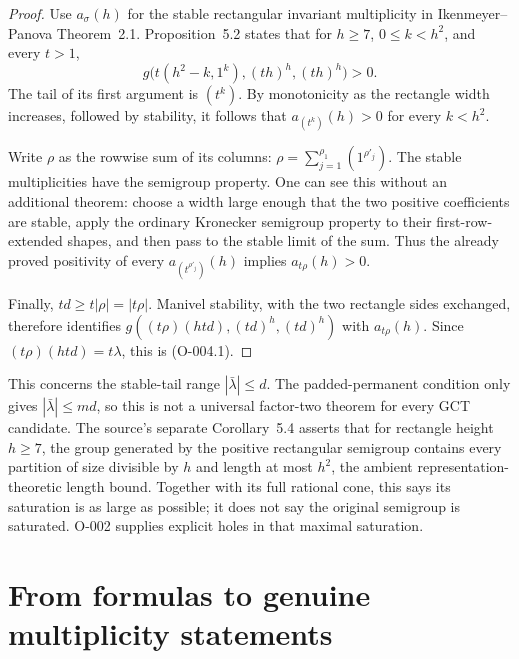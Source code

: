 \begin{proof}
Use $a_\sigma(h)$ for the stable rectangular invariant multiplicity
in Ikenmeyer--Panova Theorem~2.1.  Proposition~5.2 states that for
$h\geq7$, $0\leq k<h^2$, and every $t>1$,
\[
      g\bigl(t(h^2-k,1^k),(th)^h,(th)^h\bigr)>0.
\]
The tail of its first argument is $(t^k)$. By monotonicity as the
rectangle width increases, followed by stability, it follows that
$a_{(t^k)}(h)>0$ for every $k<h^2$.

Write $\rho$ as the rowwise sum of its columns:
$\rho=\sum_{j=1}^{\rho_1}(1^{\rho'_j})$.
The stable multiplicities have the semigroup property. One can see
this without an additional theorem: choose a width large enough that
the two positive coefficients are stable, apply the ordinary
Kronecker semigroup property to their first-row-extended shapes, and
then pass to the stable limit of the sum. Thus the already proved
positivity of every $a_{(t^{\rho'_j})}(h)$ implies
$a_{t\rho}(h)>0$.

Finally, $td\geq t|\rho|=|t\rho|$. Manivel stability, with the two
rectangle sides exchanged, therefore identifies
$g((t\rho)(htd),(td)^h,(td)^h)$ with $a_{t\rho}(h)$.
Since $(t\rho)(htd)=t\lambda$, this is (O-004.1).
\end{proof}

This concerns the stable-tail range $|\bar\lambda|\leq d$. The
padded-permanent condition only gives $|\bar\lambda|\leq md$, so this
is not a universal factor-two theorem for every GCT candidate.
The source's separate Corollary~5.4 asserts that for rectangle height
$h\geq7$, the group generated by the positive rectangular semigroup
contains every partition of size divisible by $h$ and length at most
$h^2$, the ambient representation-theoretic length bound. Together with its
full rational cone, this says its saturation is as large as possible;
it does not say the original semigroup is saturated. O-002 supplies
explicit holes in that maximal saturation.

\section{From formulas to genuine multiplicity statements}

